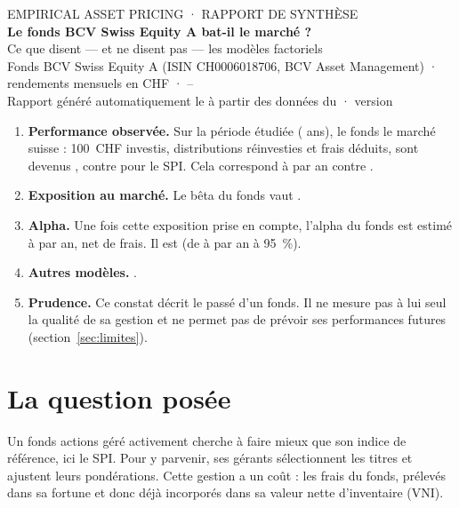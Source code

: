 \documentclass[11pt,a4paper]{article}
\begin{document}
\begin{center}
  {\small\color{gris} EMPIRICAL ASSET PRICING · RAPPORT DE SYNTHÈSE}\\[6pt]
  {\LARGE\bfseries Le fonds BCV Swiss Equity A bat-il le marché ?}\\[4pt]
  {\large Ce que disent — et ne disent pas — les modèles factoriels}\\[8pt]
  {\small Fonds BCV Swiss Equity A (ISIN CH0006018706, BCV Asset Management) · rendements mensuels en CHF · \PeriodeDebut{} – \PeriodeFin{}}\\[2pt]
  {\small\color{gris} Rapport généré automatiquement le \DateRapport{} à partir des données du \DateDonnees{} · version \texttt{\Commit}}
\end{center}

\vspace{4pt}

\begin{essentiel}
\begin{enumerate}[leftmargin=*,label=\textbf{\arabic*.}]
  \item \textbf{Performance observée.} Sur la période étudiée (\Annees{} ans), le fonds \PerfPhrase{} le marché suisse : 100~CHF investis, distributions réinvesties et frais déduits, sont devenus \CroissanceBCV{}, contre \CroissanceSPI{} pour le SPI. Cela correspond à \RendAnnBCV{} par an contre \RendAnnSPI{}.
  \item \textbf{Exposition au marché.} Le bêta du fonds vaut \BetaM{}. \TrackingPhrase
  \item \textbf{Alpha.} Une fois cette exposition prise en compte, l'alpha du fonds est estimé à \AlphaA{} par an, net de frais. Il est \AlphaVerdict{} (de \AlphaALo{} à \AlphaAHi{} par an à 95~\%).
  \item \textbf{Autres modèles.} \SpiFacteursPhrase. \EuropeCourt
  \item \textbf{Prudence.} Ce constat décrit le passé d'un fonds. Il ne mesure pas à lui seul la qualité de sa gestion et ne permet pas de prévoir ses performances futures (section~\ref{sec:limites}).
\end{enumerate}
\end{essentiel}

\section{La question posée}

Un fonds actions géré activement cherche à faire mieux que son indice de référence, ici le SPI. Pour y parvenir, ses gérants sélectionnent les titres et ajustent leurs pondérations. Cette gestion a un coût : les frais du fonds, prélevés dans sa fortune et donc déjà incorporés dans sa valeur nette d'inventaire (VNI).
\end{document}
